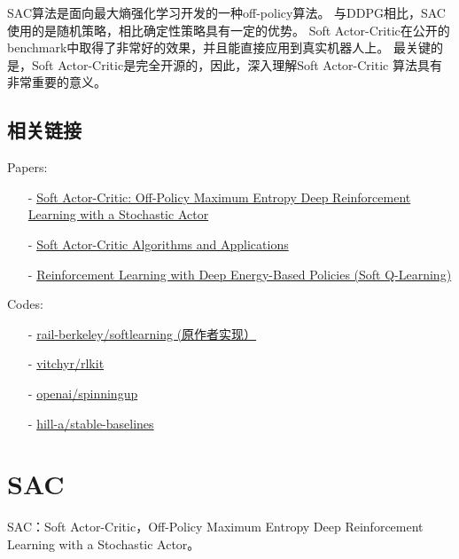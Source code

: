 SAC算法是面向最大熵强化学习开发的一种off-policy算法。
与DDPG相比，SAC使用的是随机策略，相比确定性策略具有一定的优势。
Soft Actor-Critic在公开的benchmark中取得了非常好的效果，并且能直接应用到真实机器人上。
最关键的是，Soft Actor-Critic是完全开源的，因此，深入理解Soft Actor-Critic 算法具有非常重要的意义。

\subsection{相关链接}

Papers:
\begin{itemize}
\setlength{\parskip}{0pt}
\item[-]
\href{https://arxiv.org/abs/1801.01290}{Soft Actor-Critic: 
Off-Policy Maximum Entropy Deep Reinforcement Learning with a Stochastic Actor}
\item[-]
\href{https://arxiv.org/abs/1812.05905}{Soft Actor-Critic Algorithms and Applications}
\item[-]
\href{https://arxiv.org/abs/1702.08165}{Reinforcement Learning with Deep Energy-Based Policies (Soft Q-Learning)}
\end{itemize}

Codes:
\begin{itemize}
\setlength{\parskip}{0pt}
\item[-]
\href{https://github.com/rail-berkeley/softlearning}{rail-berkeley/softlearning (原作者实现）}
\item[-]
\href{https://github.com/vitchyr/rlkit}{vitchyr/rlkit}
\item[-]
\href{https://github.com/openai/spinningup}{openai/spinningup}
\item[-]
\href{https://github.com/hill-a/stable-baselines}{hill-a/stable-baselines}
\end{itemize}


\section{SAC}



SAC：Soft Actor-Critic，Off-Policy Maximum Entropy Deep Reinforcement 
Learning with a Stochastic Actor。


